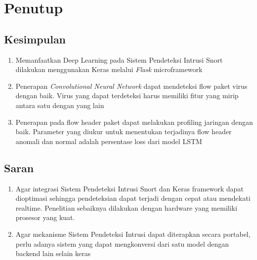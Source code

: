 \documentclass[./skripsi.tex]{subfiles}
\begin{document}
\chapter{Penutup}
\section{Kesimpulan}
\begin{enumerate}
    \item Memanfaatkan Deep Learning pada Sistem Pendeteksi Intrusi Snort dilakukan menggunakan Keras melalui \textit{Flask} microframework
    \item Penerapan \textit{Convolutional Neural Network} dapat mendeteksi flow paket virus dengan baik. Virus yang dapat terdeteksi harus memiliki fitur yang mirip antara satu dengan yang lain
    \item Penerapan  pada flow header paket dapat melakukan profiling jaringan dengan baik. Parameter yang diukur untuk menentukan terjadinya flow header anomali dan normal adalah persentase loss dari model LSTM
\end{enumerate}
\section{Saran}
\begin{enumerate}
    \item Agar integrasi Sistem Pendeteksi Intrusi Snort dan Keras framework dapat dioptimasi sehingga pendeteksian dapat terjadi dengan cepat atau mendekati realtime. Penelitian sebaiknya dilakukan dengan hardware yang memiliki prosesor yang kuat.
    \item Agar mekanisme Sistem Pendeteksi Intrusi dapat diterapkan secara portabel, perlu adanya sistem yang dapat mengkonversi dari satu model dengan backend lain selain keras
\end{enumerate}
\end{document}
